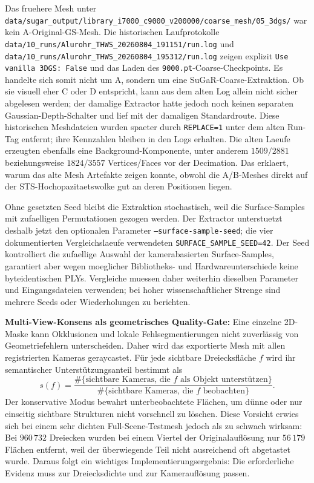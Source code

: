 \documentclass[12pt,a4paper]{article}
\begin{document}
Das fruehere Mesh unter
\texttt{data/sugar\_output/library\_i7000\_c9000\_v200000/coarse\_mesh/05\_3dgs/}
war kein A-Original-GS-Mesh. Die historischen Laufprotokolle
\texttt{data/10\_runs/Alurohr\_THWS\_20260804\_191151/run.log} und
\texttt{data/10\_runs/Alurohr\_THWS\_20260804\_195312/run.log} zeigen
explizit \texttt{Use vanilla 3DGS: False} und das Laden des
\texttt{9000.pt}-Coarse-Checkpoints. Es handelte sich somit nicht um A,
sondern um eine SuGaR-Coarse-Extraktion. Ob sie visuell eher C oder D
entspricht, kann aus dem alten Log allein nicht sicher abgelesen werden; der
damalige Extractor hatte jedoch noch keinen separaten Gaussian-Depth-Schalter
und lief mit der damaligen Standardroute. Diese historischen Meshdateien wurden
spaeter durch \texttt{REPLACE=1} unter dem alten Run-Tag entfernt; ihre
Kennzahlen bleiben in den Logs erhalten. Die alten Laeufe erzeugten ebenfalls
eine Background-Komponente, unter anderem $1509/2881$ beziehungsweise
$1824/3557$ Vertices/Faces vor der Decimation. Das erklaert, warum das alte
Mesh Artefakte zeigen konnte, obwohl die A/B-Meshes direkt auf der
STS-Hochopazitaetswolke gut an deren Positionen liegen.

Ohne gesetzten Seed bleibt die Extraktion stochastisch, weil die
Surface-Samples mit zufaelligen Permutationen gezogen werden. Der Extractor
unterstuetzt deshalb jetzt den optionalen Parameter
\texttt{--surface-sample-seed}; die vier dokumentierten Vergleichslaeufe
verwendeten \texttt{SURFACE\_SAMPLE\_SEED=42}. Der Seed kontrolliert die
zufaellige Auswahl der kamerabasierten Surface-Samples, garantiert aber wegen
moeglicher Bibliotheks- und Hardwareunterschiede keine byteidentischen PLYs.
Vergleiche muessen daher weiterhin dieselben Parameter und Eingangsdateien
verwenden; bei hoher wissenschaftlicher Strenge sind mehrere Seeds oder
Wiederholungen zu berichten.

\textbf{Multi-View-Konsens als geometrisches Quality-Gate:} Eine einzelne 2D-Maske kann Okklusionen und lokale Fehlsegmentierungen nicht zuverlässig von Geometriefehlern unterscheiden. Daher wird das exportierte Mesh mit allen registrierten Kameras geraycastet. Für jede sichtbare Dreiecksfläche $f$ wird ihr semantischer Unterstützungsanteil bestimmt als
\[
s(f) = \frac{\#\{\text{sichtbare Kameras, die } f \text{ als Objekt unterstützen}\}}
           {\#\{\text{sichtbare Kameras, die } f \text{ beobachten}\}}.
\]
Der konservative Modus bewahrt unterbeobachtete Flächen, um dünne oder nur einseitig sichtbare Strukturen nicht vorschnell zu löschen. Diese Vorsicht erwies sich bei einem sehr dichten Full-Scene-Testmesh jedoch als zu schwach wirksam: Bei $960\,732$ Dreiecken wurden bei einem Viertel der Originalauflösung nur $56\,179$ Flächen entfernt, weil der überwiegende Teil nicht ausreichend oft abgetastet wurde. Daraus folgt ein wichtiges Implementierungsergebnis: Die erforderliche Evidenz muss zur Dreiecksdichte und zur Kamerauflösung passen.
\end{document}
